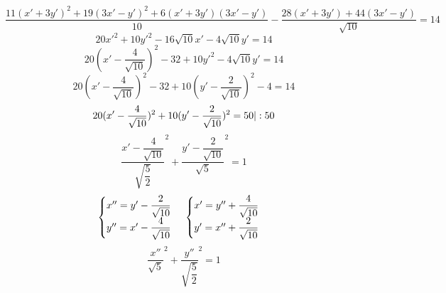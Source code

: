 \documentclass[12pt]{article}
\begin{document}
\[
    \dfrac{11(x' + 3y')^2 + 19(3x' - y')^2 + 6(x' + 3y')(3x' - y')}{10} - \dfrac{28(x' + 3y') + 44(3x' - y')}{\sqrt{10}} = 14
\]
\[
    20{x'}^2 + 10{y'}^2 - 16\sqrt{10}x' - 4\sqrt{10}y' = 14
\]
\[
    20(x' - \dfrac{4}{\sqrt{10}})^2 - 32 + 10{y'}^2 - 4\sqrt{10}y' = 14
\]
\[
    20(x' - \dfrac{4}{\sqrt{10}})^2 - 32 + 10(y' - \dfrac{2}{\sqrt{10}})^2 - 4 = 14
\]
\[
    20(x' - \dfrac{4}{\sqrt{10}})^2 + 10(y' - \dfrac{2}{\sqrt{10}})^2 = 50 \\ |:50
\]
\[
    \dfrac{x' - \dfrac{4}{\sqrt{10}}}{\sqrt{\dfrac{5}{2}}}^2 + \dfrac{y' - \dfrac{2}{\sqrt{10}}}{\sqrt{5}}^2 = 1
\]
\[
    \begin{cases}
        x'' = y' - \dfrac{2}{\sqrt{10}} \\
        y'' = x' - \dfrac{4}{\sqrt{10}} \\
    \end{cases}
    \\
    \begin{cases}
        x' = y'' + \dfrac{4}{\sqrt{10}} \\
        y' = x'' + \dfrac{2}{\sqrt{10}} \\
    \end{cases}
\]
\[
    \dfrac{x''}{\sqrt{5}}^2 + \dfrac{y''}{\sqrt{\dfrac{5}{2}}}^2 = 1
\]
\end{document}
